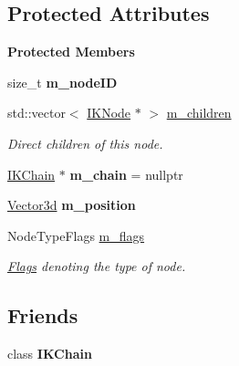 \subsection*{Protected Attributes}
\begin{Indent}\textbf{ Protected Members}\par
\begin{DoxyCompactItemize}
\item 
\mbox{\label{classrev_1_1_i_k_node_a7af376fcff80e78841a0ba43c7785fbe}} 
size\+\_\+t {\bfseries m\+\_\+node\+ID}
\item 
\mbox{\label{classrev_1_1_i_k_node_a5f5329fa2f0eff637a715cf58b655965}} 
std\+::vector$<$ \mbox{\hyperlink{classrev_1_1_i_k_node}{I\+K\+Node}} $\ast$ $>$ \mbox{\hyperlink{classrev_1_1_i_k_node_a5f5329fa2f0eff637a715cf58b655965}{m\+\_\+children}}
\begin{DoxyCompactList}\small\item\em Direct children of this node. \end{DoxyCompactList}\item 
\mbox{\label{classrev_1_1_i_k_node_a4d493413aa36793ef0b9cfff76406d33}} 
\mbox{\hyperlink{classrev_1_1_i_k_chain}{I\+K\+Chain}} $\ast$ {\bfseries m\+\_\+chain} = nullptr
\item 
\mbox{\label{classrev_1_1_i_k_node_ace38a77f392e6da56e52992def8c25e8}} 
\mbox{\hyperlink{classrev_1_1_vector}{Vector3d}} {\bfseries m\+\_\+position}
\item 
\mbox{\label{classrev_1_1_i_k_node_ad2e88c78609037bf706aa201d541b3a0}} 
Node\+Type\+Flags \mbox{\hyperlink{classrev_1_1_i_k_node_ad2e88c78609037bf706aa201d541b3a0}{m\+\_\+flags}}
\begin{DoxyCompactList}\small\item\em \mbox{\hyperlink{classrev_1_1_flags}{Flags}} denoting the type of node. \end{DoxyCompactList}\end{DoxyCompactItemize}
\end{Indent}
\subsection*{Friends}
\begin{DoxyCompactItemize}
\item 
\mbox{\label{classrev_1_1_i_k_node_ab21a07a6c2b1768e215d54d1738eeaf5}} 
class {\bfseries I\+K\+Chain}
\end{DoxyCompactItemize}
